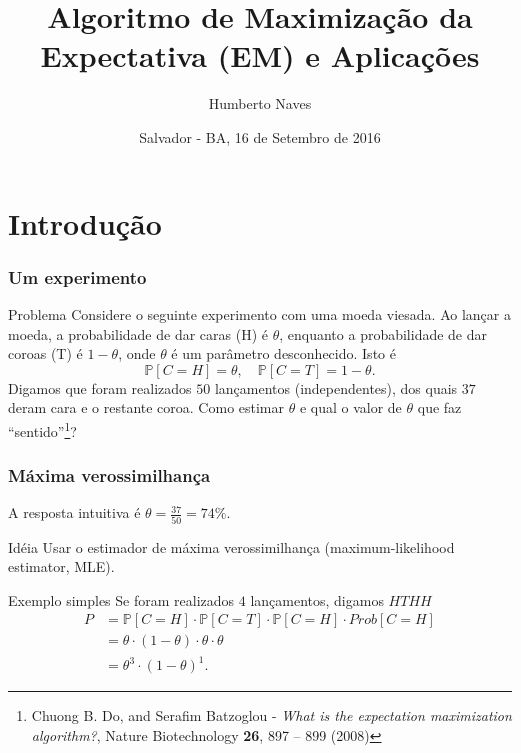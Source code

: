 \documentclass{beamer}
\title{Algoritmo de Maximização da Expectativa (EM) e Aplicações}
\author{Humberto Naves}
\date{Salvador - BA, 16 de Setembro de 2016}
\newcommand{\Prob}{\mathbb{P}}
\begin{document}
\maketitle


\section{Introdução}
\begin{frame}

	\frametitle{Um experimento}
	\begin{block}{Problema}
		Considere o seguinte experimento com uma moeda viesada. \pause
		Ao lançar a moeda, a probabilidade de dar caras (H) é $\theta$,
		enquanto a probabilidade de dar coroas (T) é $1-\theta$,
		onde $\theta$ é um parâmetro desconhecido. \pause Isto é
		\[
			\Prob[C=H] = \theta, \quad \Prob[C=T]=1-\theta.
		\]
		\pause
		Digamos que foram realizados $50$ lançamentos (independentes), dos
		quais $37$ deram cara e o restante coroa. Como estimar $\theta$
		e qual o valor de $\theta$ que faz ``sentido''\footnote{Chuong
		 B. Do,	and Serafim Batzoglou - \textit{What is the expectation
		 maximization algorithm?}, Nature Biotechnology \textbf{26},
		897 -- 899 (2008)}?
	\end{block}


\end{frame}

\begin{frame}

	\frametitle{Máxima verossimilhança}
	A resposta intuitiva é $\theta = \frac{37}{50} = 74\%$.
	\pause
	\begin{alertblock}{Idéia}
		Usar o estimador de máxima verossimilhança (maximum-likelihood
		estimator, MLE).
	\end{alertblock}
	\pause
	\begin{exampleblock}{Exemplo simples}
		Se foram realizados $4$ lançamentos, digamos $HTHH$
		\begin{align*}
			P &= \Prob[C=H]\cdot\Prob[C=T]\cdot \Prob[C=H]\cdot Prob[C=H]\\
			&= \theta \cdot (1-\theta) \cdot \theta \cdot \theta \\
			&= \theta^3 \cdot (1-\theta)^1.
		\end{align*}
	\end{exampleblock}

\end{frame}
\end{document}
